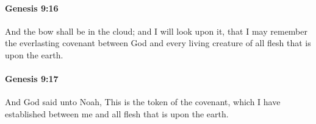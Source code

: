 		\paragraph{Genesis 9:16} %
			\label{GENESIS-9-16}

			And the bow shall be in the cloud; and I will look upon it, that I may remember the everlasting covenant between God and every living creature of all flesh that is upon the earth.


		\paragraph{Genesis 9:17} %
			\label{GENESIS-9-17}

			And God said unto Noah, This is the token of the covenant, which I have established between me and all flesh that is upon the earth.


